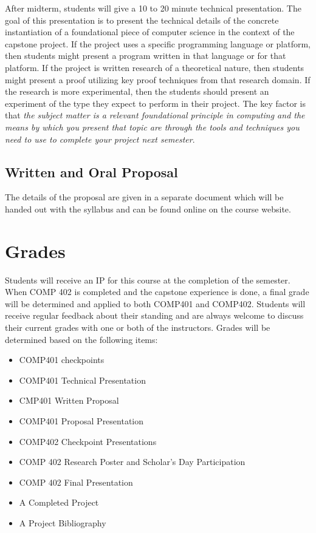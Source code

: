 \documentclass[nobib]{tufte-handout}
\begin{document}
After midterm, students will give a 10 to 20 minute technical presentation.  The goal of this presentation is to present the technical details of the concrete instantiation of a foundational piece of computer science in the context of the capstone project. If the project uses a specific programming language or platform, then students might present a program written in that language or for that platform. If the project is written research of a theoretical nature, then students might present a proof utilizing key proof techniques from that research domain. If the research is more experimental, then the students should present an experiment of the type they expect to perform in their project. The key factor is that \textit{the subject matter is a relevant foundational principle in computing and the means by which you present that topic are through the tools and techniques you need to use to complete your project next semester}.


\subsection{Written and Oral Proposal}

The details of the proposal are given in a separate document which will be handed out with the syllabus and can be found online on the course website.

\section{Grades}

Students will receive an IP for this course at the completion of the semester. When COMP 402 is completed and the capstone experience is done, a final grade will be determined and applied to both COMP401 and COMP402. Students will receive regular feedback about their standing and are always welcome to discuss their current grades with one or both of the instructors. Grades will be determined based on the following items:
\begin{itemize}
\item COMP401 checkpoints
\item COMP401 Technical Presentation
\item CMP401 Written Proposal
\item COMP401 Proposal Presentation
\item COMP402 Checkpoint Presentations
\item COMP 402 Research Poster and Scholar's Day Participation
\item COMP 402 Final Presentation
\item A Completed Project
\item A Project Bibliography
\end{itemize}
\end{document}
